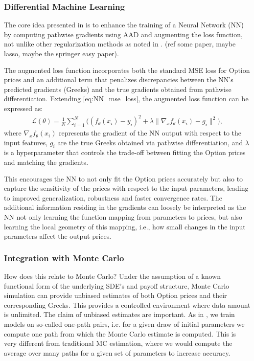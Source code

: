 \subsubsection{Differential Machine Learning}

The core idea presented in \textcite{hugeDifferentialMachineLearning2020} is to enhance the training of a Neural Network (NN) by computing pathwise gradients using AAD \textcite{gilesSmokingAdjointsFast} and augmenting the loss function, not unlike other regularization methods as noted in \textcite{frandsenDeltaForceOption2022}. (ref some paper, maybe lasso, maybe the springer easy paper). 

The augmented loss function incorporates both the standard MSE loss for Option prices and an additional term that penalizes discrepancies between the NN's predicted gradients (Greeks) and the true gradients obtained from pathwise differentiation. Extending \eqref{eq:NN_mse_loss}, the augmented loss function can be expressed as:
\begin{align} \label{eq:NN_augmented_loss}
    \mathcal{L}(\theta) = \frac{1}{N} \sum_{i=1}^N \Big( (f_\theta(x_i) - y_i)^2 + \lambda \|\nabla_x f_\theta(x_i) - g_i\|^2 \Big),
\end{align}
where $\nabla_x f_\theta(x_i)$ represents the gradient of the NN output with respect to the input features, $g_i$ are the true Greeks obtained via pathwise differentiation, and $\lambda$ is a hyperparameter that controls the trade-off between fitting the Option prices and matching the gradients.

This encourages the NN to not only fit the Option prices accurately but also to capture the sensitivity of the prices with respect to the input parameters, leading to improved generalization, robustness and faster convergence rates. The additional information residing in the gradients can loosely be interpreted as the NN not only learning the function mapping from parameters to prices, but also learning the local geometry of this mapping, i.e., how small changes in the input parameters affect the output prices. 

\subsubsection{Integration with Monte Carlo}

How does this relate to Monte Carlo? Under the assumption of a known functional form of the underlying SDE's and payoff structure, Monte Carlo simulation can provide unbiased estimates of both Option prices and their corresponding Greeks. This provides a controlled environment where data amount is unlimited. The claim of unbiased estimates are important. As in \textcite{hugeDifferentialMachineLearning2020}, we train models on so-called one-path pairs, i.e. for a given draw of initial parameters we compute one path from which the Monte Carlo estimate is computed. This is very different from traditional MC estimation, where we would compute the average over many paths for a given set of parameters to increase accuracy.

